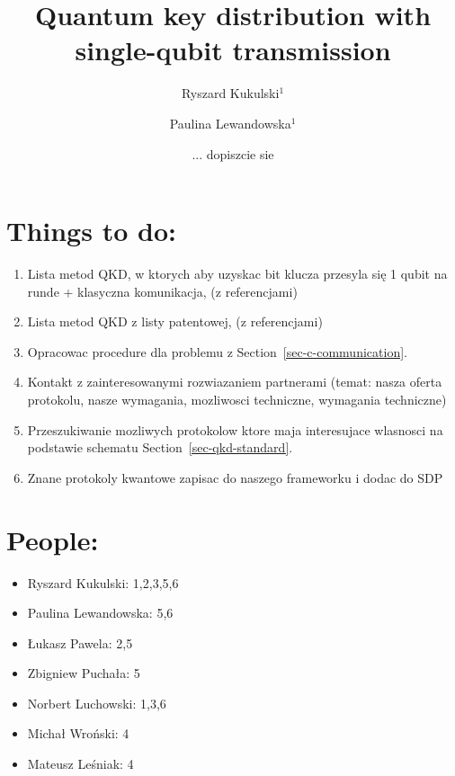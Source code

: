 \documentclass[12pt,a4paper,reqno, aps, superscriptaddress]{amsart}
\title[Quantum key distribution]{Quantum key distribution with single-qubit transmission}
\author{Ryszard Kukulski$^1$\orcidlink{0000-0002-9171-1734}}
\author{Paulina Lewandowska$^1$\orcidlink{0000-0003-1564-7782}}
\author{... dopiszcie sie}
\begin{document}
\maketitle

\section{Things to do:}
\begin{enumerate}
\item Lista metod QKD, w ktorych aby uzyskac bit klucza przesyla się 1 qubit na runde + klasyczna komunikacja, (z referencjami)
\item Lista metod QKD z listy patentowej, (z referencjami)
\item Opracowac procedure dla problemu z Section~\ref{sec-c-communication}.
\item Kontakt z zainteresowanymi rozwiazaniem partnerami (temat: nasza oferta protokolu, nasze wymagania, mozliwosci techniczne, wymagania techniczne)
\item Przeszukiwanie mozliwych protokolow ktore maja interesujace wlasnosci na podstawie schematu Section~\ref{sec-qkd-standard}.
\item Znane protokoly kwantowe zapisac do naszego frameworku i dodac do SDP
\end{enumerate}

\section{People:}
\begin{itemize}
    \item Ryszard Kukulski: 1,2,3,5,6
    \item Paulina Lewandowska: 5,6
    \item Łukasz Pawela: 2,5
    \item Zbigniew Puchała: 5
    \item Norbert Luchowski: 1,3,6
    \item Michał Wroński: 4
    \item Mateusz Leśniak: 4
\end{itemize}

\newpage
\end{document}
